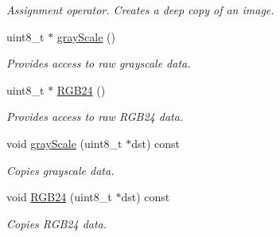 \begin{DoxyCompactItemize}
\begin{DoxyCompactList}\small\item\em Assignment operator. Creates a deep copy of an image. \end{DoxyCompactList}\item 
uint8\_\-t $\ast$ \hyperlink{classipl_1_1Image_a5ffdb8d6366aaab7c1927a440a1746e6}{grayScale} ()
\begin{DoxyCompactList}\small\item\em Provides access to raw grayscale data. \end{DoxyCompactList}\item 
uint8\_\-t $\ast$ \hyperlink{classipl_1_1Image_afd049935ba96ca692b0275e58a65d1c1}{RGB24} ()
\begin{DoxyCompactList}\small\item\em Provides access to raw RGB24 data. \end{DoxyCompactList}\item 
void \hyperlink{classipl_1_1Image_adc0d68dfc4be8323ecc3332e01f45b27}{grayScale} (uint8\_\-t $\ast$dst) const 
\begin{DoxyCompactList}\small\item\em Copies grayscale data. \end{DoxyCompactList}\item 
void \hyperlink{classipl_1_1Image_a85de167997e1dd886f6efd826312a49a}{RGB24} (uint8\_\-t $\ast$dst) const 
\begin{DoxyCompactList}\small\item\em Copies RGB24 data. \end{DoxyCompactList}\end{DoxyCompactItemize}
